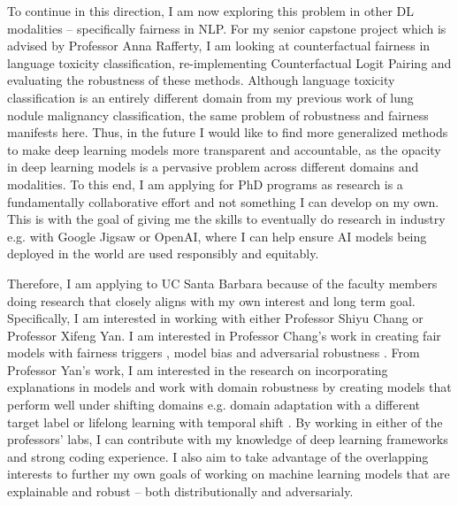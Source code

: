 \documentclass[10pt]{article}
\begin{document}
To continue in this direction, I am now exploring this problem in other DL modalities -- specifically fairness in NLP. For my senior capstone project which is advised by Professor Anna Rafferty, I am looking at counterfactual fairness in language toxicity classification, re-implementing Counterfactual Logit Pairing \cite{garg2019counterfactual} and evaluating the robustness of these methods. Although language toxicity classification is an entirely different domain from my previous work of lung nodule malignancy classification, the same problem of robustness and fairness manifests here. Thus, in the future I would like to find more generalized methods to make deep learning models more transparent and accountable, 
as the opacity in deep learning models is a pervasive problem across different domains and modalities.
To this end, I am applying for PhD programs as research is a fundamentally collaborative effort and not something I can develop on my own.
This is with the goal of giving me the skills to eventually do research in industry e.g. with Google Jigsaw or OpenAI, where I can help ensure AI models being deployed in the world are used responsibly and equitably.

Therefore, I am applying to UC Santa Barbara because of the faculty members doing research that closely aligns with my own interest and long term goal. Specifically, I am interested in working with either Professor Shiyu Chang or Professor Xifeng Yan. I am interested in Professor Chang's work in creating fair models with fairness triggers \cite{zhang2022fairness}, model bias \cite{bao2022learning} and adversarial robustness \cite{zhang2022robustify}. From Professor Yan's work, I am interested in the research on incorporating explanations in models \cite{li2022explanations} and work with domain robustness by creating models that perform well under shifting domains e.g. domain adaptation with a different target label \cite{ma2021semi} or lifelong learning with temporal shift \cite{qian2021lifelong}. By working in either of the professors' labs, I can contribute with my knowledge of deep learning frameworks and strong coding experience. I also aim to take advantage of the overlapping interests to further my own goals of working on machine learning models that are explainable and robust -- both distributionally and adversarialy.
\end{document}
